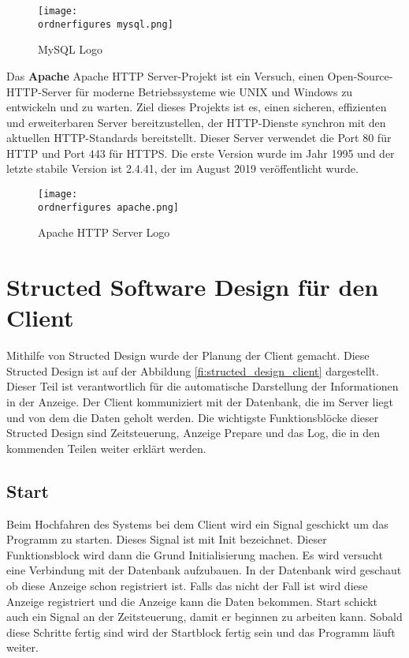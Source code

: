 \begin{figure}[H]
	\centering
	\texttt{[image: \\ordnerfigures mysql.png]}
	\caption{MySQL Logo\cite{40_mysql_img}}
	\label{fi:mysql}
\end{figure}

Das \textbf{Apache} Apache HTTP Server-Projekt ist ein Versuch, einen Open-Source-HTTP-Server f\"{u}r moderne Betriebssysteme wie UNIX und Windows zu entwickeln und zu warten. Ziel dieses Projekts ist es, einen sicheren, effizienten und erweiterbaren Server bereitzustellen, der HTTP-Dienste synchron mit den aktuellen HTTP-Standards bereitstellt. Dieser Server verwendet die Port 80 f\"{u}r HTTP und Port 443 f\"{u}r HTTPS. Die erste Version wurde im Jahr 1995 und der letzte stabile Version ist 2.4.41, der im August 2019 ver\"{o}ffentlicht wurde.\cite{40_apache}



\begin{figure}[H]
	\centering
	\texttt{[image: \\ordnerfigures apache.png]}
	\caption{Apache HTTP Server Logo\cite{40_apache_img}}
	\label{fi:apache}
\end{figure}


\section{Structed Software Design für den Client}

Mithilfe von Structed Design wurde der Planung der Client gemacht. Diese Structed Design ist auf der Abbildung \ref{fi:structed_design_client} dargestellt. 
Dieser Teil ist verantwortlich f\"{u}r die automatische Darstellung der Informationen in der Anzeige. Der Client kommuniziert mit der Datenbank, die im Server liegt und von dem die Daten geholt werden. Die wichtigste Funktionsbl\"{o}cke dieser Structed Design sind Zeitsteuerung, Anzeige Prepare und das Log, die in den kommenden Teilen weiter erkl\"{a}rt werden.

\subsection{Start}
Beim Hochfahren des Systems bei dem Client wird ein Signal geschickt um das Programm zu starten. Dieses Signal ist mit Init bezeichnet. Dieser Funktionsblock wird dann die Grund Initialisierung machen. Es wird versucht eine Verbindung mit der Datenbank aufzubauen. In der Datenbank wird geschaut ob diese Anzeige schon registriert ist. Falls das nicht der Fall ist wird diese Anzeige registriert und die Anzeige kann die Daten bekommen. Start schickt auch ein Signal an der Zeitsteuerung, damit er beginnen zu arbeiten kann. Sobald diese Schritte fertig sind wird der Startblock fertig sein und das Programm l\"{a}uft weiter.


